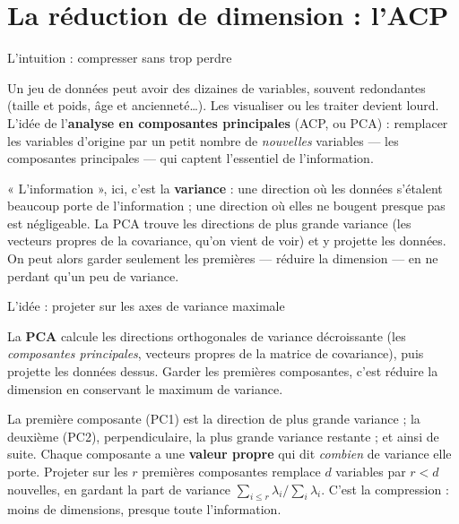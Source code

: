 \documentclass[aspectratio=169,11pt]{beamer}
\begin{document}
\section{La réduction de dimension : l'ACP}

\begin{frame}{L'intuition : compresser sans trop perdre}
\begin{ucadfront}
{\small Un jeu de données peut avoir des dizaines de variables, souvent redondantes (taille et poids, âge et ancienneté\dots). Les visualiser ou les traiter devient lourd. L'idée de l'\textbf{analyse en composantes principales} (ACP, ou PCA) : remplacer les variables d'origine par un petit nombre de \emph{nouvelles} variables — les composantes principales — qui captent l'essentiel de l'information.}
\end{ucadfront}
{\small « L'information », ici, c'est la \textbf{variance} : une direction où les données s'étalent beaucoup porte de l'information ; une direction où elles ne bougent presque pas est négligeable. La PCA trouve les directions de plus grande variance (les vecteurs propres de la covariance, qu'on vient de voir) et y projette les données. On peut alors garder seulement les premières — réduire la dimension — en ne perdant qu'un peu de variance.}
\end{frame}

\begin{frame}{L'idée : projeter sur les axes de variance maximale}
\begin{ucaddef}
{\small La \textbf{PCA} calcule les directions orthogonales de variance décroissante (les \emph{composantes principales}, vecteurs propres de la matrice de covariance), puis projette les données dessus. Garder les premières composantes, c'est réduire la dimension en conservant le maximum de variance.}
\end{ucaddef}
{\small La première composante (PC1) est la direction de plus grande variance ; la deuxième (PC2), perpendiculaire, la plus grande variance restante ; et ainsi de suite. Chaque composante a une \textbf{valeur propre} qui dit \emph{combien} de variance elle porte. Projeter sur les $r$ premières composantes remplace $d$ variables par $r < d$ nouvelles, en gardant la part de variance $\sum_{i \le r}\lambda_i / \sum_i \lambda_i$. C'est la compression : moins de dimensions, presque toute l'information.}
\end{frame}
\end{document}

